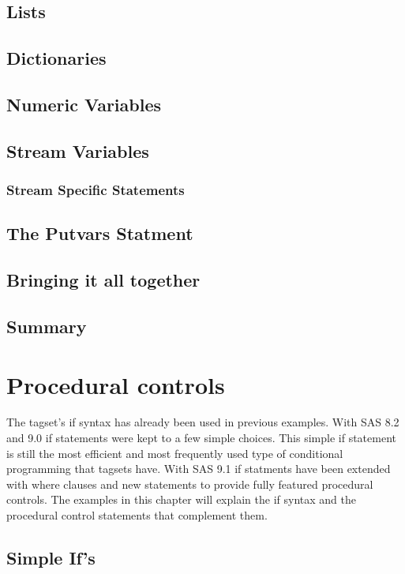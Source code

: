 \documentclass{book}
\begin{document}
\section{Lists}

\section{Dictionaries}

\section{Numeric Variables}

\section{Stream Variables}

\subsection{Stream Specific Statements}

\section{The Putvars Statment}

\section{Bringing it all together}

\section{Summary}

\chapter{Procedural controls}
The tagset's if syntax has already been used in previous examples. 
With SAS 8.2 and 9.0 if statements were kept to a few simple 
choices.  This simple if statement is still the most efficient
and most frequently used type of conditional programming that
tagsets have.  With SAS 9.1 if statments have been extended with
where clauses and new statements to provide fully featured procedural
controls.  
The examples in this chapter will explain the if syntax and the procedural control
statements that complement them.
\section{Simple If's}
\end{document}
